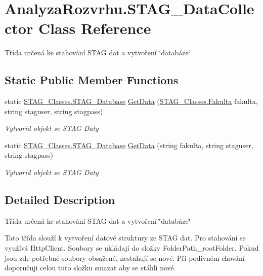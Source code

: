 \hypertarget{class_analyza_rozvrhu_1_1_s_t_a_g___data_collector}{}\section{Analyza\+Rozvrhu.\+S\+T\+A\+G\+\_\+\+Data\+Collector Class Reference}
\label{class_analyza_rozvrhu_1_1_s_t_a_g___data_collector}


Třída určená ke stahování S\+T\+AG dat a vytvoření \char`\"{}databáze\char`\"{}  


\subsection*{Static Public Member Functions}
\begin{DoxyCompactItemize}
\item 
static \hyperlink{class_analyza_rozvrhu_1_1_s_t_a_g___classes_1_1_s_t_a_g___database}{S\+T\+A\+G\+\_\+\+Classes.\+S\+T\+A\+G\+\_\+\+Database} \hyperlink{class_analyza_rozvrhu_1_1_s_t_a_g___data_collector_ad0936e0aab42d6a5335c1ebacdcc1526}{Get\+Data} (\hyperlink{namespace_analyza_rozvrhu_1_1_s_t_a_g___classes_a2e3181499083134e3da66098b571fb83}{S\+T\+A\+G\+\_\+\+Classes.\+Fakulta} fakulta, string staguser, string stagpass)
\begin{DoxyCompactList}\small\item\em Vytvorid objekt se S\+T\+AG Daty \end{DoxyCompactList}\item 
static \hyperlink{class_analyza_rozvrhu_1_1_s_t_a_g___classes_1_1_s_t_a_g___database}{S\+T\+A\+G\+\_\+\+Classes.\+S\+T\+A\+G\+\_\+\+Database} \hyperlink{class_analyza_rozvrhu_1_1_s_t_a_g___data_collector_a450c532cb4e473e554ec9caf902f924b}{Get\+Data} (string fakulta, string staguser, string stagpass)
\begin{DoxyCompactList}\small\item\em Vytvorid objekt se S\+T\+AG Daty \end{DoxyCompactList}\end{DoxyCompactItemize}


\subsection{Detailed Description}
Třída určená ke stahování S\+T\+AG dat a vytvoření \char`\"{}databáze\char`\"{} 

Tato třída slouží k vytvoření datové struktury ze S\+T\+AG dat. Pro stahování se využívá Http\+Client. Soubory se ukládají do složky {\ttfamily Folder\+Path\+\_\+root\+Folder}. Pokud jsou zde potřebné soubory obsažené, nestahují se nové. Při podivném chování doporučuji celou tuto složku smazat aby se stáhli nové. 

